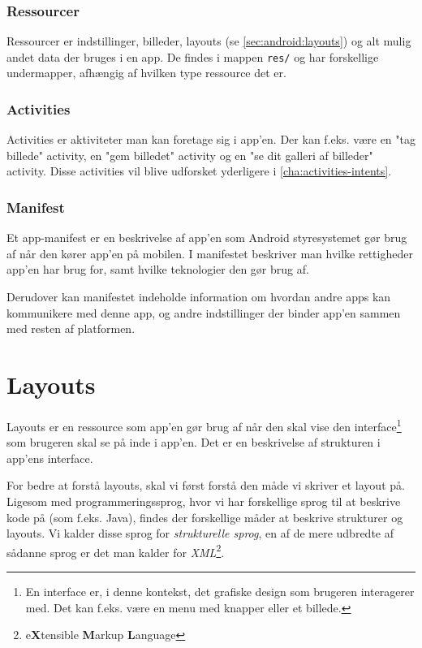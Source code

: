 \subsubsection{Ressourcer}
Ressourcer er indstillinger, billeder, layouts (se \autoref{sec:android:layouts}) og alt mulig andet data der bruges i en app. De findes i mappen \texttt{res/} og har forskellige undermapper, afhængig af hvilken type ressource det er.

\subsubsection{Activities}
Activities er aktiviteter man kan foretage sig i app'en. Der kan f.eks. være en "tag billede" activity, en "gem billedet" activity og en "se dit galleri af billeder" activity. Disse activities vil blive udforsket yderligere i \autoref{cha:activities-intents}.

\subsubsection{Manifest}
Et app-manifest er en beskrivelse af app'en som Android styresystemet gør brug af når den kører app'en på mobilen. I manifestet beskriver man hvilke rettigheder app'en har brug for, samt hvilke teknologier den gør brug af.

Derudover kan manifestet indeholde information om hvordan andre apps kan kommunikere med denne app, og andre indstillinger der binder app'en sammen med resten af platformen.

\section{Layouts}
\label{sec:android:layouts}

Layouts er en ressource som app'en gør brug af når den skal vise den 
\gls{interface}\footnote{En \gls{interface} er, i denne kontekst, det grafiske 
design som brugeren interagerer med. Det kan f.eks. være en menu med knapper 
eller et billede.} som brugeren skal se på inde i app'en. Det er en beskrivelse 
af strukturen i app'ens \gls{interface}.

For bedre at forstå layouts, skal vi først forstå den måde vi skriver et layout på. Ligesom med programmeringssprog, hvor vi har forskellige sprog til at beskrive kode på (som f.eks. Java), findes der forskellige måder at beskrive strukturer og layouts. Vi kalder disse sprog for \textit{strukturelle sprog}, en af de mere udbredte af sådanne sprog er det man kalder for \textit{XML}\footnote{e\textbf{X}tensible \textbf{M}arkup \textbf{L}anguage}.

